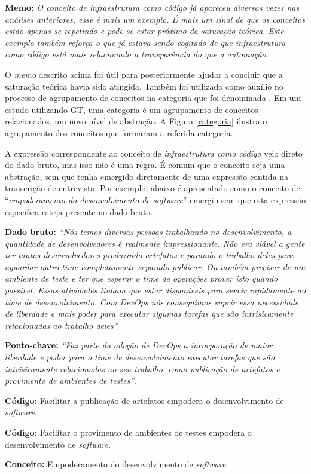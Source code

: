 \textbf{Memo:} \textit{O conceito de infraestrutura como código já apareceu
diversas vezes nas análises anteriores, esse é mais um exemplo. É mais um sinal
de que os conceitos estão apenas se repetindo e pode-se estar próximo da
saturação teórica. Este exemplo também reforça o que já estava sendo cogitado
de que infraestrutura como código está mais relacionado a transparência do que
a automação}.

O {\it memo} descrito acima foi útil para posteriormente ajudar a concluir que
a saturação teórica havia sido atingida. Também foi utilizado como auxílio no
processo de agrupamento de conceitos na categoria que foi denominada
. Em um estudo utilizando \acrshort{GT},
uma categoria é um agrupamento de  conceitos relacionados, um novo nível de
abstração. A Figura \ref{categoria} ilustra o agrupamento dos conceitos
que formaram a referida categoria.


A expressão correspondente ao conceito de \emph{infraestrutura como código}
veio direto do dado bruto, mas isso não é uma regra. É comum que o conceito
seja uma abstração, sem que tenha emergido diretamente de uma expressão contida na
transcrição de entrevista. Por exemplo, abaixo é apresentado como o conceito
de ``\emph{empoderamento do desenvolvimento de software}'' emergiu sem que esta
expressão específica esteja presente no dado bruto.

\textbf{Dado bruto:} {\it ``Nós temos diversas pessoas trabalhando no
desenvolvimento, a quantidade de desenvolvedores é realmente impressionante.
Não era viável a gente ter tantos desenvolvedores produzindo artefatos e
parando o trabalho deles para aguardar outro time completamente separado
publicar. Ou também precisar de um ambiente de teste e ter que esperar o time
de operações prover isto quando possível. Essas atividades tinham que estar
disponíveis para servir rapidamente ao time de desenvolvimento. Com DevOps
nós conseguimos suprir essa necessidade de liberdade e mais poder para executar
algumas tarefas que são intrisicamente relacionadas ao trabalho deles''}

{\bf Ponto-chave:} \textit{``Faz parte da adoção de DevOps a incorporação
de maior liberdade e poder para o time de desenvolvimento executar tarefas que
são intrisicamente relacionadas ao seu trabalho, como publicação de artefatos
e provimento de ambientes de testes''}.

{\bf Código:} Facilitar a publicação de artefatos empodera o desenvolvimento de
{\it software}.

{\bf Código:} Facilitar o provimento de ambientes de testes empodera o
desenvolvimento de {\it software}.

{\bf Conceito:} Empoderamento do desenvolvimento de {\it software}.






